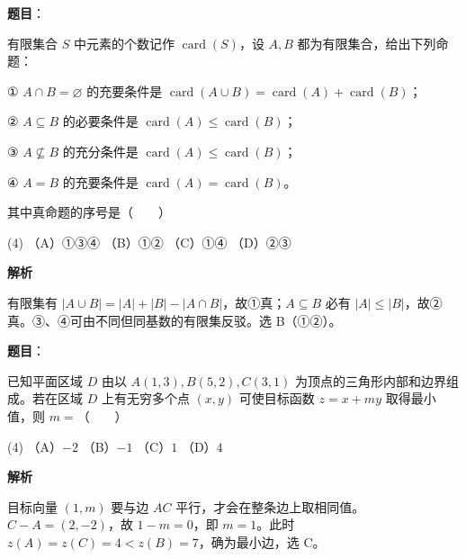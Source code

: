 \begin{answer}

\textbf{题目}：

有限集合 $S$ 中元素的个数记作 $\operatorname{card}(S)$，设 $A,B$ 都为有限集合，给出下列命题：

① $A\cap B=\varnothing$ 的充要条件是 $\operatorname{card}(A\cup B)=\operatorname{card}(A)+\operatorname{card}(B)$；

② $A\subseteq B$ 的必要条件是 $\operatorname{card}(A)\leqslant\operatorname{card}(B)$；

③ $A\nsubseteq B$ 的充分条件是 $\operatorname{card}(A)\leqslant\operatorname{card}(B)$；

④ $A=B$ 的充要条件是 $\operatorname{card}(A)=\operatorname{card}(B)$。

其中真命题的序号是\mbox{（　　）}

\begin{gkopts}(4)
\task （A）①③④
\task （B）①②
\task （C）①④
\task （D）②③
\end{gkopts}

\textbf{解析}

有限集有 $|A\cup B|=|A|+|B|-|A\cap B|$，故①真；$A\subseteq B$ 必有 $|A|\le|B|$，故②真。③、④可由不同但同基数的有限集反驳。选 B（①②）。


\end{answer}
\begin{answer}

\textbf{题目}：

已知平面区域 $D$ 由以 $A(1,3),B(5,2),C(3,1)$ 为顶点的三角形内部和边界组成。若在区域 $D$ 上有无穷多个点 $(x,y)$ 可使目标函数 $z=x+my$ 取得最小值，则 $m=$\mbox{（　　）}

\begin{gkopts}(4)
\task （A）$-2$
\task （B）$-1$
\task （C）$1$
\task （D）$4$
\end{gkopts}

\textbf{解析}

目标向量 $(1,m)$ 要与边 $AC$ 平行，才会在整条边上取相同值。$C-A=(2,-2)$，故 $1-m=0$，即 $m=1$。此时 $z(A)=z(C)=4<z(B)=7$，确为最小边，选 C。


\end{answer}
